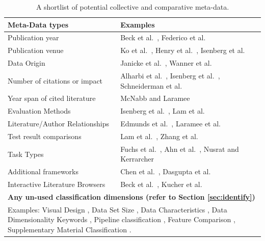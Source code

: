 \begin{table}[t]
\footnotesize
\centering
{}
\begin{tabularx}{1\textwidth}{|X|X|}
\hline \rowcolor{black!30}
Meta-Data types & Examples \\ \hline
Publication year & Beck et al.\ \cite{beck2014state}, Federico et al.\ \cite{federico2016survey} \\
Publication venue & Ko et al.\ \cite{ko2016survey}, Henry et al.\ \cite{henry200720}, Isenberg et al.\ \cite{isenberg2017VPD}\\
Data Origin & Janicke et al.\ \cite{janicke2016visual}, Wanner et al.\ \cite{wanner2014state} \\
Number of citations or impact & Alharbi et al.\ \cite{alharbi2018sos}, Isenberg et al.\ \cite{isenberg2017VPD}, Schneiderman et al.\ \cite{schneiderman2012innovation} \\
Year span of cited literature & McNabb and Laramee \cite{mcnabb2017sos}\\
Evaluation Methods & Isenberg et al.\ \cite{isenberg2013systematic}, Lam et al.\ \cite{lam2012empirical} \\
Literature/Author Relationships & Edmunds et al.\ \cite{edmunds2012surface}, Laramee et al.\ \cite{laramee2004state} \\
Test result comparisons & Lam et al.\ \cite{lam2012empirical}, Zhang et al.\ \cite{zhang2012visual}\\ 
Task Types & Fuchs et al.\ \cite{fuchs2016systematic}, Ahn et al.\ \cite{ahn2014task}, Nusrat and Kerrarcher \cite{nusrat2015task} \\
Additional frameworks & Chen et al.\ \cite{chen2015survey}, Dasgupta et al.\ \cite{dasgupta2012conceptualizing}\\
Interactive Literature Browsers & Beck et al.\ \cite{beck2016visual}, Kucher et al.\ \cite{kucher2015text}\\
\hline
\multicolumn{2}{|m{15.2cm}|}{\centering \textbf{Any un-used classification dimensions (refer to Section \ref{sec:identify})}}\\ \hline
\multicolumn{2}{|m{15.2cm}|}{\small Examples: Visual Design \cite{tong2018storytelling}, Data Set Size , Data Characteristics \cite{janicke2016visual, wanner2014state}, Data Dimensionality  \cite{isenberg2013systematic, fuchs2016systematic} Keywords \cite{isenberg2017visualization}, Pipeline classification \cite{liu2017visualizing}, Feature Comparison \cite{brezovsky2013software}, Supplementary Material Classification \cite{chavent2011gpu, gehlenborg2010visualization, secrier2013visualizing}.}\\


\hline
\end{tabularx}
\caption{A shortlist of potential collective and comparative meta-data.} \label{table:metaTable}
\end{table}


